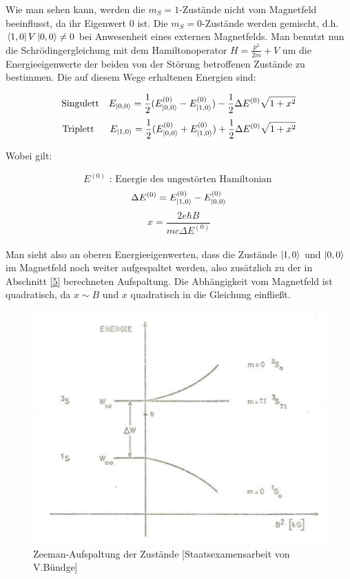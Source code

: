 Wie man sehen kann, werden die $m_S = 1$-Zustände nicht vom Magnetfeld beeinflusst, da ihr Eigenwert 0 ist. Die $m_S = 0$-Zustände werden gemischt, d.h. $\bra{1,0}V\ket{0,0}\neq 0$ bei Anwesenheit eines externen Magnetfelds. Man benutzt nun die Schrödingergleichung mit dem Hamiltonoperator $H=\frac{p^2}{2m}+V$ um die Energieeigenwerte der beiden von der Störung betroffenen Zustände zu bestimmen. Die auf diesem Wege erhaltenen Energien sind:

\begin{equation} \text{Singulett\ \ \ } E_{\ket{0,0}} = \frac{1}{2}(E_{\ket{0,0}}^{(0)} - E_{\ket{1,0}}^{(0)}) - \frac{1}{2}\Delta E^{(0)}\sqrt{1+x^2} \end{equation}
\begin{equation} \text{Triplett\ \ \ \ \ } E_{\ket{1,0}} = \frac{1}{2}(E_{\ket{0,0}}^{(0)} + E_{\ket{1,0}}^{(0)}) + \frac{1}{2}\Delta E^{(0)}\sqrt{1+x^2} \end{equation}

Wobei gilt:

$$ E^{(0)} \text{ : Energie des ungestörten Hamiltonian \ } $$
$$ \Delta E^{(0)} = E_{\ket{1,0}}^{(0)} - E_{\ket{0,0}}^{(0)} $$
\begin{equation} x = \frac{2e\hbar B}{mc\Delta E^{(0)}} \end{equation} \\

Man sieht also an oberen Energieeigenwerten, dass die Zustände $\ket{1,0}$ und $\ket{0,0}$ im Magnetfeld noch weiter aufgespaltet werden, also zusätzlich zu der in Abschnitt \ref{5} berechneten Aufspaltung. Die Abhängigkeit vom Magnetfeld ist quadratisch, da $x\sim B$ und $x$ quadratisch in die Gleichung einfließt.

\begin{figure}[H]
\centering \includegraphics[width=\textwidth]{BilderTheorie/Zeeman.png}
\caption{Zeeman-Aufspaltung der Zustände [Staatsexamensarbeit von V.Bündge]}
\end{figure}

